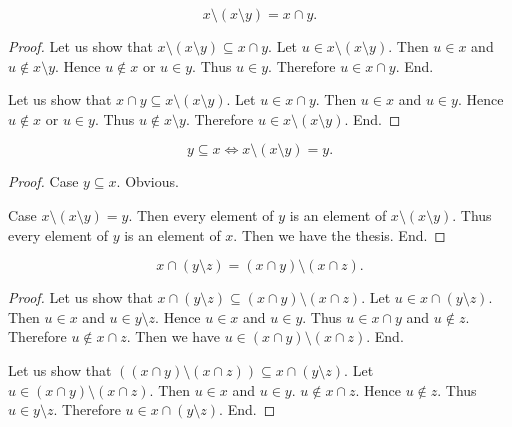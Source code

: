 \documentclass[../../sets-and-functions.ftl.tex]{subfiles}
\begin{document}
\begin{forthel}
    \begin{proposition}[SF 01 01 408438]
      $$x \setminus (x \setminus y) = x \cap y.$$
    \end{proposition}
    \begin{proof}
      Let us show that $x \setminus (x \setminus y) \subseteq x \cap y$.
        Let $u \in x \setminus (x \setminus y)$.
        Then $u \in x$ and $u \notin x \setminus y$.
        Hence $u \notin x$ or $u \in y$.
        Thus $u \in y$.
        Therefore $u \in x \cap y$.
      End.

      Let us show that $x \cap y \subseteq x \setminus (x \setminus y)$.
        Let $u \in x \cap y$.
        Then $u \in x$ and $u \in y$.
        Hence $u \notin x$ or $u \in y$.
        Thus $u \notin x \setminus y$.
        Therefore $u \in x \setminus (x \setminus y)$.
      End.
    \end{proof}


    \begin{proposition}[SF 01 01 185130]
      $$y \subseteq x \iff x \setminus (x \setminus y) = y.$$
    \end{proposition}
    \begin{proof}
      Case $y \subseteq x$. Obvious.

      Case $x \setminus (x \setminus y) = y$.
        Then every element of $y$ is an element of $x \setminus
        (x \setminus y)$.
        Thus every element of $y$ is an element of $x$.
        Then we have the thesis.
      End.
    \end{proof}


    \begin{proposition}[SF 01 01 878796]
      $$x \cap (y \setminus z) = (x \cap y) \setminus (x \cap z).$$
    \end{proposition}
    \begin{proof}
      Let us show that $x \cap (y \setminus z) \subseteq (x \cap y) \setminus
      (x \cap z)$.
        Let $u \in x \cap (y \setminus z)$.
        Then $u \in x$ and $u \in y \setminus z$.
        Hence $u \in x$ and $u \in y$.
        Thus $u \in x \cap y$ and $u \notin z$.
        Therefore $u \notin x \cap z$.
        Then we have $u \in (x \cap y) \setminus (x \cap z)$.
      End.

      Let us show that $((x \cap y) \setminus (x \cap z)) \subseteq x \cap
      (y \setminus z)$.
        Let $u \in (x \cap y) \setminus (x \cap z)$.
        Then $u \in x$ and $u \in y$.
        $u \notin x \cap z$.
        Hence $u \notin z$.
        Thus $u \in y \setminus z$.
        Therefore $u \in x \cap (y \setminus z)$.
      End.
    \end{proof}
  \end{forthel}
\end{document}

